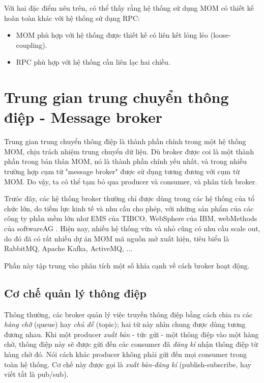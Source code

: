 \documentclass{article}
\begin{document}
Với hai đặc điểm nêu trên, có thể thấy rằng hệ thống sử dụng MOM có thiết kế
hoàn toàn khác với hệ thống sử dụng RPC:

\begin{itemize}
    \item MOM phù hợp với hệ thống được thiết kế có liên kết lỏng lẻo
        (loose-coupling).
    \item RPC phù hợp với hệ thống cần liên lạc hai chiều.
\end{itemize}

\section{Trung gian trung chuyển thông điệp - Message broker}

Trung gian trung chuyển thông điệp là thành phần chính trong một hệ thống MOM,
chịu trách nhiệm trung chuyển dữ liệu. Dù broker được coi là một thành phần
trong bản thân MOM, nó là thành phần chính yếu nhất, và trong nhiều trường hợp
cụm từ "message broker" được sử dụng tương đương với cụm từ MOM. Do vậy, ta có
thể tạm bỏ qua producer và consumer, và phân tích broker.

Trưóc đây, các hệ thống broker thường chỉ được dùng trong các hệ thống của tổ
chức lớn, do tiềm lực kinh tế và nhu cầu cho phép, với những sản phẩm của các
công ty phần mềm lớn như EMS của TIBCO, WebSphere của IBM, webMethods của
softwareAG \cite{Kleppmann17C}. Hiện nay, nhiều hệ thống vừa và nhỏ cũng có nhu
cầu scale out, do đó đã có rất nhiều dự án MOM mã nguồn mở xuất hiện, tiêu biểu
là RabbitMQ, Apache Kafka, ActiveMQ, ...

Phần này tập trung vào phân tích một số khía cạnh về cách broker hoạt động.

\subsection{Cơ chế quản lý thông điệp}

Thông thường, các broker quản lý việc truyền thông điệp bằng cách chia ra các
\emph{hàng chờ} (queue) hay \emph{chủ đề} (topic); hai từ này nhìn chung được
dùng tương đương nhau. Khi một producer \emph{xuất bản} - tức gửi - một thông
điệp vào một hàng chờ, thông điệp này sẽ được gửi đến các consumer đã \emph{đăng
kí} nhận thông điệp từ hàng chờ đó. Nói cách khác producer không phải gửi đến
mọi consumer trong toàn hệ thống. Cơ chế này được gọi là \emph{xuất bản-đăng kí}
(publish-subscribe, hay viết tắt là pub/sub).
\end{document}
